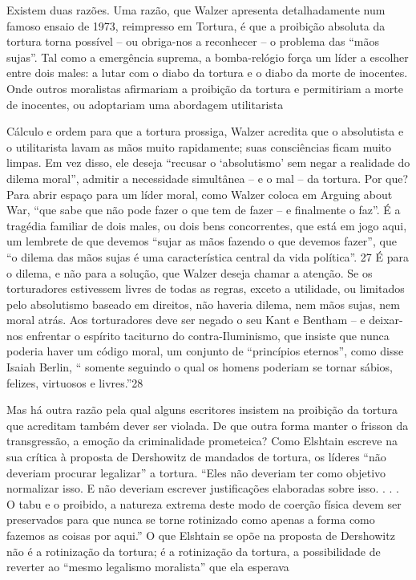  \par 
Existem duas razões. Uma razão, que Walzer apresenta detalhadamente num famoso ensaio de 1973, reimpresso em Tortura, é que a proibição absoluta da tortura torna possível – ou obriga-nos a reconhecer – o problema das “mãos sujas”. Tal como a emergência suprema, a bomba-relógio força um líder a escolher entre dois males: a lutar com o diabo da tortura e o diabo da morte de inocentes. Onde outros moralistas afirmariam a proibição da tortura e permitiriam a morte de inocentes, ou adoptariam uma abordagem utilitarista
 \par 
Cálculo e ordem para que a tortura prossiga, Walzer acredita que o absolutista e o utilitarista lavam as mãos muito rapidamente; suas consciências ficam muito limpas. Em vez disso, ele deseja “recusar o ‘absolutismo’ sem negar a realidade do dilema moral”, admitir a necessidade simultânea – e o mal – da tortura. Por que? Para abrir espaço para um líder moral, como Walzer coloca em Arguing about War, “que sabe que não pode fazer o que tem de fazer – e finalmente o faz”. É a tragédia familiar de dois males, ou dois bens concorrentes, que está em jogo aqui, um lembrete de que devemos “sujar as mãos fazendo o que devemos fazer”, que “o dilema das mãos sujas é uma característica central da vida política”. {\color{blue}27} É para o dilema, e não para a solução, que Walzer deseja chamar a atenção. Se os torturadores estivessem livres de todas as regras, exceto a utilidade, ou limitados pelo absolutismo baseado em direitos, não haveria dilema, nem mãos sujas, nem moral atrás. Aos torturadores deve ser negado o seu Kant e Bentham – e deixar-nos enfrentar o espírito taciturno do contra-Iluminismo, que insiste que nunca poderia haver um código moral, um conjunto de “princípios eternos”, como disse Isaiah Berlin, “ somente seguindo o qual os homens poderiam se tornar sábios, felizes, virtuosos e livres.”{\color{blue}28}
 \par 
Mas há outra razão pela qual alguns escritores insistem na proibição da tortura que acreditam também dever ser violada. De que outra forma manter o frisson da transgressão, a emoção da criminalidade prometeica? Como Elshtain escreve na sua crítica à proposta de Dershowitz de mandados de tortura, os líderes “não deveriam procurar legalizar” a tortura. “Eles não deveriam ter como objetivo normalizar isso. E não deveriam escrever justificações elaboradas sobre isso. . . . O tabu e o proibido, a natureza extrema deste modo de coerção física devem ser preservados para que nunca se torne rotinizado como apenas a forma como fazemos as coisas por aqui.” O que Elshtain se opõe na proposta de Dershowitz não é a rotinização da tortura; é a rotinização da tortura, a possibilidade de reverter ao “mesmo legalismo moralista” que ela esperava
